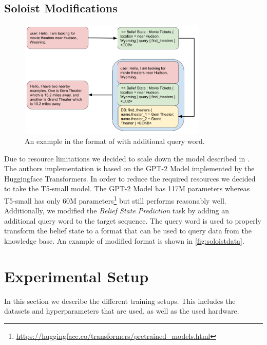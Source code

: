 \documentclass[twocolumn]{tum-article}
\begin{document}
\subsection{Soloist Modifications}
\label{sec:soloist_mod}
\begin{figure}[!h]
\centering
\includegraphics[width=0.8\textwidth]{figures/Soloist_Data.png}
\caption{An example in the format of \cite{peng2020soloist} with additional query word.}
\label{fig:soloistdata}
\end{figure}
Due to resource limitations we decided to scale down the model described in \cite{peng2020soloist}. The authors implementation is based on the GPT-2 Model\cite{radford2019language} implemented by the Huggingface Transformers\cite{wolf2019huggingface}. In order to reduce the required resources we decided to take the T5-small\cite{raffel2019exploring} model. The GPT-2 Model has 117M parameters whereas T5-small has only 60M parameters\footnote{\url{https://huggingface.co/transformers/pretrained_models.html}} but still performs reasonably well.
Additionally, we modified the \textit{Belief State Prediction} task by adding an additional query word to the target sequence. The query word is used to properly transform the belief state to a format that can be used to query data from the knowledge base. An example of modified format is shown in \autoref{fig:soloistdata}. 

\section{Experimental Setup}
In this section we describe the different training setups. This includes the datasets and hyperparameters that are used, as well as the used hardware.
\end{document}
